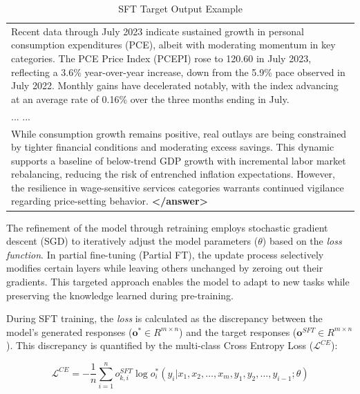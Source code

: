 \begin{table}[h]
\begin{tabular}{p{}}
    Recent data through July 2023 indicate sustained growth in personal consumption expenditures (PCE), albeit with moderating momentum in key categories. The PCE Price Index (PCEPI) rose to 120.60 in July 2023, reflecting a 3.6\% year-over-year increase, down from the 5.9\% pace observed in July 2022. Monthly gains have decelerated notably, with the index advancing at an average rate of 0.16\% over the three months ending in July. \\

    ... ... \\

    While consumption growth remains positive, real outlays are being constrained by tighter financial conditions and moderating excess savings. This dynamic supports a baseline of below-trend GDP growth with incremental labor market rebalancing, reducing the risk of entrenched inflation expectations. However, the resilience in wage-sensitive services categories warrants continued vigilance regarding price-setting behavior. \textbf{\textless /answer\textgreater} \\
    \bottomrule
    \end{tabular}
    \caption{SFT Target Output Example}
    \label{tab:ch2:sft_target_output_example}
\end{table}



The refinement of the model through retraining employs stochastic gradient descent (SGD) to iteratively adjust the model parameters ($\theta$) based on the \textit{loss function}. In partial fine-tuning (Partial FT), the update process selectively modifies certain layers while leaving others unchanged by zeroing out their gradients. This targeted approach enables the model to adapt to new tasks while preserving the knowledge learned during pre-training.


During SFT training, the \textit{loss} is calculated as the discrepancy between the model's generated responses ($\bm{o^*} \in R^{m\times n}$) and the target responses ($\bm{o}^{SFT} \in R^{m \times n}$). This discrepancy is quantified by the multi-class Cross Entropy Loss ($\mathcal{L}^{CE}$):


\begin{equation*}
  \mathcal{L}^{CE} = -\frac{1}{n}\sum_{i=1}^{n} o^{SFT}_{k, i}\log  o^*_i(y_i|x_1, x_2, \dots,x_m, y_1, y_2, \dots, y_{i-1}; \theta)
\end{equation*}




